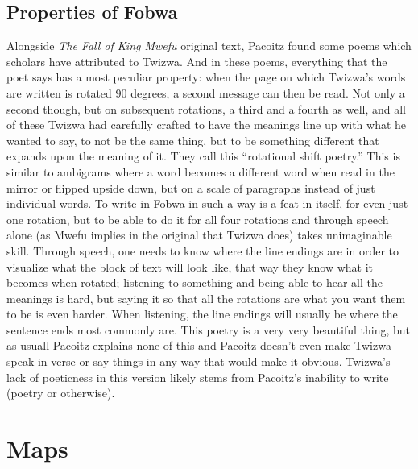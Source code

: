 \section{Properties of Fobwa}
\label{rotshift}
Alongside \emph{The Fall of King Mwefu} original text, Pacoitz found some poems which scholars have attributed to Twizwa. And in these poems, everything that the poet says has a most peculiar property: when the page on which Twizwa's words are written is rotated 90 degrees, a second message can then be read. Not only a second though, but on subsequent rotations, a third and a fourth as well, and all of these Twizwa had carefully crafted to have the meanings line up with what he wanted to say, to not be the same thing, but to be something different that expands upon the meaning of it. They call this ``rotational shift poetry.'' This is similar to ambigrams where a word becomes a different word when read in the mirror or flipped upside down, but on a scale of paragraphs instead of just individual words. To write in Fo\-bwa in such a way is a feat in itself, for even just one rotation, but to be able to do it for all four rotations and through speech alone (as Mwefu implies in the original that Twizwa does) takes unimaginable skill. Through speech, one needs to know where the line endings are in order to visualize what the block of text will look like, that way they know what it becomes when rotated; listening to something and being able to hear all the meanings is hard, but saying it so that all the rotations are what you want them to be is even harder. When listening, the line endings will usually be where the sentence ends most commonly are. This poetry is a very very beautiful thing, but as usuall Pacoitz explains none of this and Pacoitz doesn't even make Twizwa speak in verse or say things in any way that would make it obvious. Twizwa's lack of poeticness in this version likely stems from Pacoitz's inability to write (poetry or otherwise).

\chapter{Maps}
